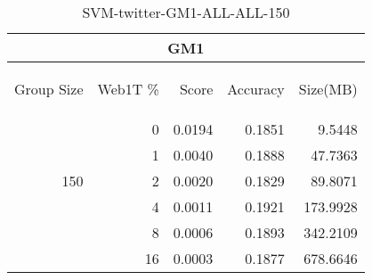 \begin{center}
\begin{table}[htbp] 
 \begin{center}
\begin{tabular}{ | r | r | r | r | r |}
\hline
\multicolumn{5}{|c|}{GM1}\\
\hline
\begin{sideways}Group Size\end{sideways} & \begin{sideways}Web1T \%\end{sideways} & \begin{sideways}Score\end{sideways} & \begin{sideways}Accuracy\end{sideways} & \begin{sideways}Size(MB)\end{sideways}\\
\hline
\multirow{5}{*}{150}
 & 0 & 0.0194 & 0.1851 & 9.5448\\ \cline{2-5}
 & 1 & 0.0040 & 0.1888 & 47.7363\\ \cline{2-5}
 & 2 & 0.0020 & 0.1829 & 89.8071\\ \cline{2-5}
 & 4 & 0.0011 & 0.1921 & 173.9928\\ \cline{2-5}
 & 8 & 0.0006 & 0.1893 & 342.2109\\ \cline{2-5}
 & 16 & 0.0003 & 0.1877 & 678.6646\\ \cline{2-5}
\hline
\end{tabular}
\caption{SVM-twitter-GM1-ALL-ALL-150}
\label{table:SVM-twitter-GM1-ALL-ALL-150}
\end{center}
 \end{table}
\end{center}

